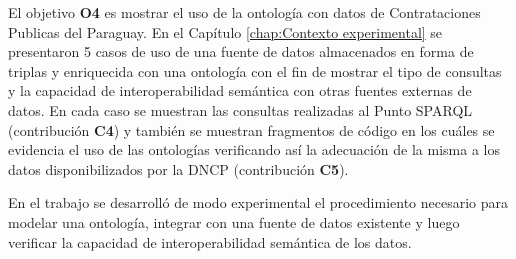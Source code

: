 El objetivo \textbf{O4} es mostrar el uso de la ontología con datos de Contrataciones Publicas del Paraguay. En el Capítulo \ref{chap:Contexto experimental} se presentaron 5 casos de uso de una fuente de datos almacenados en forma de triplas y enriquecida con una ontología con el fin de mostrar el tipo de consultas y la capacidad de interoperabilidad semántica con otras fuentes externas de datos. En cada caso se muestran las consultas realizadas al Punto SPARQL (contribución \textbf{C4}) y también se muestran fragmentos de código en los cuáles se evidencia el uso de las ontologías verificando así la adecuación de la misma a los datos disponibilizados por la DNCP (contribución \textbf{C5}).

En el trabajo se desarrolló de modo experimental el procedimiento necesario para modelar una ontología, integrar con una fuente de datos existente y luego verificar la capacidad de interoperabilidad semántica de los datos. 